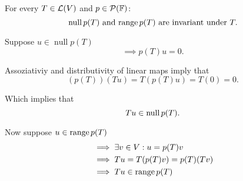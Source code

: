 \begin{thm} 
  \label{thm: null space and range of p(T) are invariant under T}
  For every $T \in \mathcal{L}(V)$ and $p\in \mathcal{P} (\mathbb{F})$:
  \begin{equation}
    \mynull p(T)$ and $\myrange p(T)$ are invariant under $T.
  \end{equation}
\end{thm}
\begin{prf}
  Suppose $u\in \operatorname{null} p(T)$
  \begin{equation}
    \implies p(T)u = 0.
  \end{equation}

  Assoziativiy and distributivity of linear maps imply that
  \begin{equation}
    (p(T))(Tu)=T(p(T)u)=T(0)=0.
  \end{equation}

  Which implies that
  \begin{equation}
    Tu \in \operatorname{null} p(T).
  \end{equation}

  Now suppose $u \in \operatorname{range} p(T)$
  \begin{equation}
    \begin{aligned}
      &\implies \exists v\in V: u=p(T)v \\
      &\implies Tu=T(p(T)v)=p(T)(Tv) \\
      &\implies Tu \in \operatorname{range} p(T)
    \end{aligned}
  \end{equation}
  \vspace{-1.1em}
\end{prf}